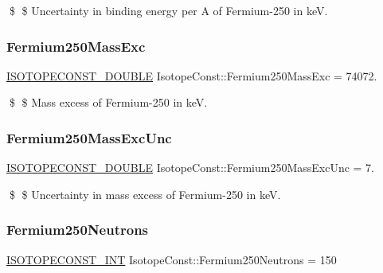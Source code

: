 \$ \$ Uncertainty in binding energy per A of Fermium-\/250 in keV. \mbox{\label{group___isotope_const-_fermium-_fm250_ga5e2c45835fd040bae8cc3c0738096a61}} 
\subsubsection{\texorpdfstring{Fermium250\+Mass\+Exc}{Fermium250MassExc}}
{\footnotesize\ttfamily \mbox{\hyperlink{group___isotope_const-_macros_ga8f45a7272ce02c0b4c65c44636ed719a}{I\+S\+O\+T\+O\+P\+E\+C\+O\+N\+S\+T\+\_\+\+D\+O\+U\+B\+LE}} Isotope\+Const\+::\+Fermium250\+Mass\+Exc = 74072.}

\$ \$ Mass excess of Fermium-\/250 in keV. \mbox{\label{group___isotope_const-_fermium-_fm250_ga5450693d156184c3e32bd2d1343f51c4}} 
\subsubsection{\texorpdfstring{Fermium250\+Mass\+Exc\+Unc}{Fermium250MassExcUnc}}
{\footnotesize\ttfamily \mbox{\hyperlink{group___isotope_const-_macros_ga8f45a7272ce02c0b4c65c44636ed719a}{I\+S\+O\+T\+O\+P\+E\+C\+O\+N\+S\+T\+\_\+\+D\+O\+U\+B\+LE}} Isotope\+Const\+::\+Fermium250\+Mass\+Exc\+Unc = 7.}

\$ \$ Uncertainty in mass excess of Fermium-\/250 in keV. \mbox{\label{group___isotope_const-_fermium-_fm250_ga4e6d85241bf6d100e2d7ff4922bf33d7}} 
\subsubsection{\texorpdfstring{Fermium250\+Neutrons}{Fermium250Neutrons}}
{\footnotesize\ttfamily \mbox{\hyperlink{group___isotope_const-_macros_ga5f18360b3e99483a35c32d789e62621c}{I\+S\+O\+T\+O\+P\+E\+C\+O\+N\+S\+T\+\_\+\+I\+NT}} Isotope\+Const\+::\+Fermium250\+Neutrons = 150}

